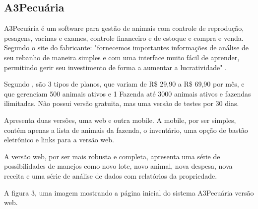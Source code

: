 



\subsection{\textbf{A3Pecuária}}

A3Pecuária é um software para gestão de animais com controle de reprodução, pesagens, vacinas e exames, controle financeiro e de estoque e compra e venda. Segundo o site do fabricante: "fornecemos importantes informações de análise de seu rebanho de maneira simples e com uma interface muito fácil de aprender, permitindo gerir seu investimento de forma a aumentar a lucratividade"  \cite{a3pecuaria16}.

Segundo , são 3 tipos de planos, que variam de R\$ 29,90 a R\$ 69,90 por mês, e que gerenciam 500 animais ativos e 1 Fazenda até 3000 animais ativos e fazendas ilimitadas. Não possui versão gratuita, mas uma versão de testes por 30 dias.

Apresenta duas versões, uma web e outra mobile. A mobile, por ser simples, contém apenas a lista de animais da fazenda, o inventário, uma opção de bastão eletrônico e links para a versão web.

A versão web, por ser mais robusta e completa, apresenta uma série de possibilidades de manejos como novo lote, novo animal, nova despesa, nova receita e uma série de análise de dados com relatórios da propriedade.

A figura 3, uma imagem mostrando a página inicial do sistema A3Pecuária versão web.


